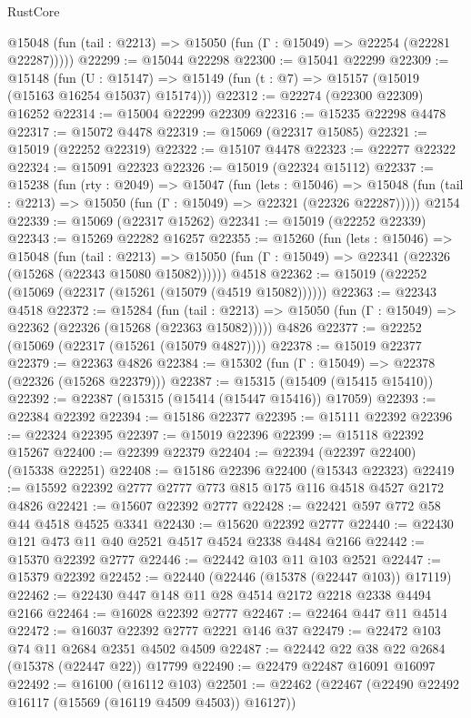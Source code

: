 \begin{lexlean}{RustCore}
\begin{coremodule}
      @15048 (fun (tail : @2213) => @15050 (fun (Γ : @15049) => @22254 (@22281 @22287)))))
@22299 := @15044 @22298
@22300 := @15041 @22299
@22309 := @15148
    (fun (U : @15147) => @15149 (fun (t : @7) => @15157 (@15019 (@15163 @16254 @15037) @15174)))
@22312 := @22274 (@22300 @22309) @16252
@22314 := @15004 @22299 @22309
@22316 := @15235 @22298 @4478
@22317 := @15072 @4478
@22319 := @15069 (@22317 @15085)
@22321 := @15019 (@22252 @22319)
@22322 := @15107 @4478
@22323 := @22277 @22322
@22324 := @15091 @22323
@22326 := @15019 (@22324 @15112)
@22337 := @15238
    (fun (rty : @2049) =>
    @15047
      (fun (lets : @15046) =>
      @15048 (fun (tail : @2213) => @15050 (fun (Γ : @15049) => @22321 (@22326 @22287)))))
    @2154
@22339 := @15069 (@22317 @15262)
@22341 := @15019 (@22252 @22339)
@22343 := @15269 @22282 @16257
@22355 := @15260
    (fun (lets : @15046) =>
    @15048
      (fun (tail : @2213) =>
      @15050 (fun (Γ : @15049) => @22341 (@22326 (@15268 (@22343 @15080 @15082))))))
    @4518
@22362 := @15019 (@22252 (@15069 (@22317 (@15261 (@15079 (@4519 @15082))))))
@22363 := @22343 @4518
@22372 := @15284
    (fun (tail : @2213) => @15050 (fun (Γ : @15049) => @22362 (@22326 (@15268 (@22363 @15082)))))
    @4826
@22377 := @22252 (@15069 (@22317 (@15261 (@15079 @4827))))
@22378 := @15019 @22377
@22379 := @22363 @4826
@22384 := @15302 (fun (Γ : @15049) => @22378 (@22326 (@15268 @22379)))
@22387 := @15315 (@15409 (@15415 @15410))
@22392 := @22387 (@15315 (@15414 (@15447 @15416)) @17059)
@22393 := @22384 @22392
@22394 := @15186 @22377
@22395 := @15111 @22392
@22396 := @22324 @22395
@22397 := @15019 @22396
@22399 := @15118 @22392 @15267
@22400 := @22399 @22379
@22404 := @22394 (@22397 @22400) (@15338 @22251)
@22408 := @15186 @22396 @22400 (@15343 @22323)
@22419 := @15592 @22392 @2777 @2777 @773 @815 @175 @116 @4518 @4527 @2172 @4826
@22421 := @15607 @22392 @2777
@22428 := @22421 @597 @772 @58 @44 @4518 @4525 @3341
@22430 := @15620 @22392 @2777
@22440 := @22430 @121 @473 @11 @40 @2521 @4517 @4524 @2338 @4484 @2166
@22442 := @15370 @22392 @2777
@22446 := @22442 @103 @11 @103 @2521
@22447 := @15379 @22392
@22452 := @22440 (@22446 (@15378 (@22447 @103)) @17119)
@22462 := @22430 @447 @148 @11 @28 @4514 @2172 @2218 @2338 @4494 @2166
@22464 := @16028 @22392 @2777
@22467 := @22464 @447 @11 @4514
@22472 := @16037 @22392 @2777 @2221 @146 @37
@22479 := @22472 @103 @74 @11 @2684 @2351 @4502 @4509
@22487 := @22442 @22 @38 @22 @2684 (@15378 (@22447 @22)) @17799
@22490 := @22479 @22487 @16091 @16097
@22492 := @16100 (@16112 @103)
@22501 := @22462 (@22467 (@22490 @22492 @16117 (@15569 (@16119 @4509 @4503)) @16127))

\end{coremodule}
\end{lexlean}

